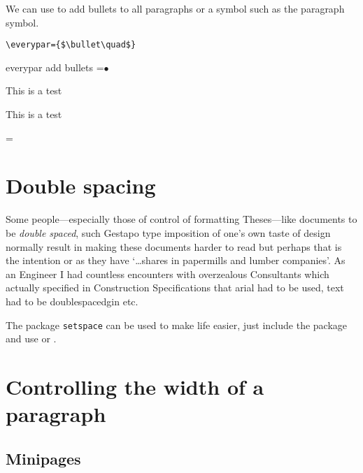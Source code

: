 We can use  to add bullets to all paragraphs or a symbol such as the paragraph symbol.
\medskip

\verb+\everypar={$\bullet\quad$}+

\begin{texexample}{everypar add bullets}{}
\everypar={$\bullet\quad$}

This is a test

This is a test

\everypar={}
\end{texexample}

\section{Double spacing}

Some people---especially those of control of formatting Theses---like documents to be \textit{double spaced}, such Gestapo type imposition of one's own taste of design normally result in making these documents harder to read but perhaps that is the intention or as \cite{Abrahams2003, Wilson2009} they have `\ldots shares in papermills and lumber companies'. As an Engineer I had countless encounters with overzealous Consultants which actually specified in Construction Specifications that arial had to be used, text had to be doublespacedgin etc. 

\begin{macro}{\onehalfspacing}
\begin{macro}{\doublespacing}
The package \texttt{setspace} \cite{setspace} can be used to make life easier, just include the package and use  or .
\end{macro}
\end{macro}


\section{Controlling the width of a paragraph}
\subsection{Minipages}


